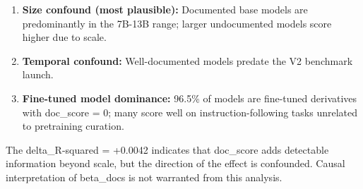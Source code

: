 \begin{enumerate}
\item \textbf{Size confound (most plausible):} Documented base models are predominantly in the 7B-13B range; larger undocumented models score higher due to scale.
\item \textbf{Temporal confound:} Well-documented models predate the V2 benchmark launch.
\item \textbf{Fine-tuned model dominance:} 96.5\% of models are fine-tuned derivatives with doc\_score = 0; many score well on instruction-following tasks unrelated to pretraining curation.
\end{enumerate}

The delta\_R-squared = +0.0042 indicates that doc\_score adds detectable information beyond scale, but the direction of the effect is confounded. Causal interpretation of beta\_docs is not warranted from this analysis.
